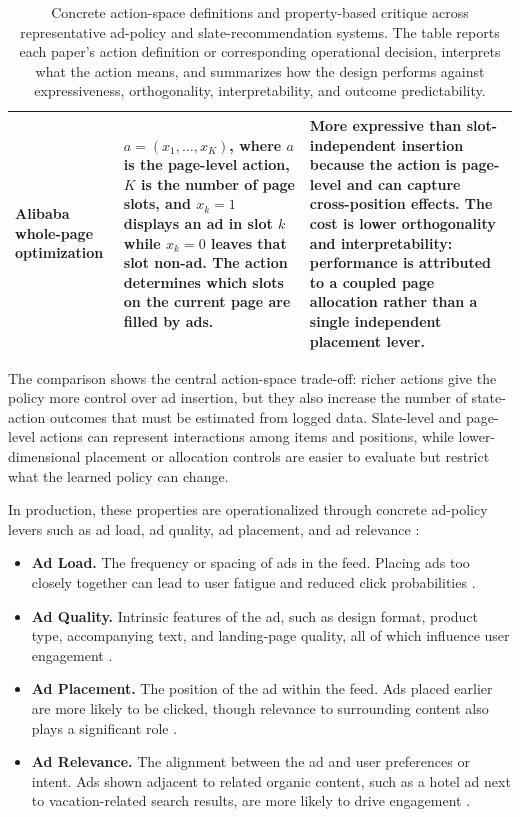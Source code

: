 \documentclass[manuscript,review,screen]{acmart}
\begin{document}
\begin{table}[ht]
\begin{tabularx}{\textwidth}{>{\raggedright\arraybackslash}p{} >{\raggedright\arraybackslash}X >{\raggedright\arraybackslash}X}
Alibaba whole-page optimization \cite{zhang2018whole} & $a=(x_1,\ldots,x_K)$, where $a$ is the page-level action, $K$ is the number of page slots, and $x_k=1$ displays an ad in slot $k$ while $x_k=0$ leaves that slot non-ad. The action determines which slots on the current page are filled by ads. & More expressive than slot-independent insertion because the action is page-level and can capture cross-position effects. The cost is lower orthogonality and interpretability: performance is attributed to a coupled page allocation rather than a single independent placement lever. \\
\bottomrule
\end{tabularx}
\caption{Concrete action-space definitions and property-based critique across representative ad-policy and slate-recommendation systems. The table reports each paper's action definition or corresponding operational decision, interprets what the action means, and summarizes how the design performs against expressiveness, orthogonality, interpretability, and outcome predictability.}
\label{tab:action-space-comparison}
\end{table}

The comparison shows the central action-space trade-off: richer actions give the policy more control over ad insertion, but they also increase the number of state-action outcomes that must be estimated from logged data. Slate-level and page-level actions can represent interactions among items and positions, while lower-dimensional placement or allocation controls are easier to evaluate but restrict what the learned policy can change.

In production, these properties are operationalized through concrete ad-policy levers such as ad load, ad quality, ad placement, and ad relevance \cite{koutsopoulos2016native}:

\begin{itemize}
    \item \textbf{Ad Load.} The frequency or spacing of ads in the feed. Placing ads too closely together can lead to user fatigue and reduced click probabilities \cite{abrams2007personalized, zhao2020jointly}.
    \item \textbf{Ad Quality.} Intrinsic features of the ad, such as design format, product type, accompanying text, and landing-page quality, all of which influence user engagement \cite{yan2009much, nielsen2017advertising}.
    \item \textbf{Ad Placement.} The position of the ad within the feed. Ads placed earlier are more likely to be clicked, though relevance to surrounding content also plays a significant role \cite{zhao2020jointly, saha2021advertiming, yuan2020unbiased}.
    \item \textbf{Ad Relevance.} The alignment between the ad and user preferences or intent. Ads shown adjacent to related organic content, such as a hotel ad next to vacation-related search results, are more likely to drive engagement \cite{chakrabarti2008contextual, Zhou2018}.
\end{itemize}
\end{document}
